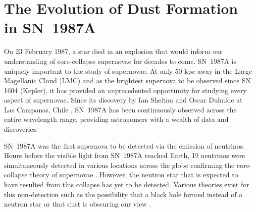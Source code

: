 \chapter{The Evolution of Dust Formation in SN~1987A}\label{chp:chp5}

%




On 23 February 1987, a star died in an explosion that would inform our understanding of core-collapse supernovae for decades to come.  SN~1987A is uniquely important to the study of supernovae.  At only 50 kpc away in the Large Magellanic Cloud (LMC) and as the brightest supernova to be observed since SN 1604 (Kepler), it has provided an unprecedented opportunity for studying every aspect of supernovae.  Since its discovery by Ian Shelton and Oscar Duhalde at Las Campanas, Chile \citep{Kunkel1987}, SN~1987A has been continuously observed across the entire wavelength range, providing astronomers with a wealth of data and discoveries.  

SN~1987A was the first supernova to be detected via the emission of neutrinos.  Hours before the visible light from SN~1987A reached Earth, 19 neutrinos were simultaneously detected in various locations across the globe confirming the core-collapse theory of supernovae \citep{Bionta1987,Hirata1987}.  However, the neutron star that is expected to have resulted from this collapse has yet to be detected.  Various theories exist for this non-detection such as the possibility that a black hole formed instead of a neutron star or that dust is obscuring our view \citep{Brown1992}.

